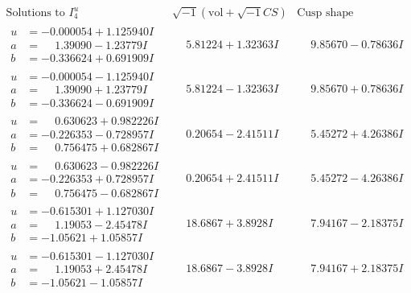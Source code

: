 \documentclass[1p]{elsarticle_modified}
\theoremstyle{definition}
\newcommand{\I}{\sqrt{-1}}
\begin{document}
$$\begin{array}{c|c|c}  
\text{Solutions to }I^u_{4}& \I (\text{vol} + \sqrt{-1}CS) & \text{Cusp shape}\\
 \hline 
\begin{aligned}
u &= -0.000054 + 1.125940 I \\
a &= \phantom{-}1.39090 - 1.23779 I \\
b &= -0.336624 + 0.691909 I\end{aligned}
 & \phantom{-}5.81224 + 1.32363 I & \phantom{-}9.85670 - 0.78636 I \\ \hline\begin{aligned}
u &= -0.000054 - 1.125940 I \\
a &= \phantom{-}1.39090 + 1.23779 I \\
b &= -0.336624 - 0.691909 I\end{aligned}
 & \phantom{-}5.81224 - 1.32363 I & \phantom{-}9.85670 + 0.78636 I \\ \hline\begin{aligned}
u &= \phantom{-}0.630623 + 0.982226 I \\
a &= -0.226353 - 0.728957 I \\
b &= \phantom{-}0.756475 + 0.682867 I\end{aligned}
 & \phantom{-}0.20654 - 2.41511 I & \phantom{-}5.45272 + 4.26386 I \\ \hline\begin{aligned}
u &= \phantom{-}0.630623 - 0.982226 I \\
a &= -0.226353 + 0.728957 I \\
b &= \phantom{-}0.756475 - 0.682867 I\end{aligned}
 & \phantom{-}0.20654 + 2.41511 I & \phantom{-}5.45272 - 4.26386 I \\ \hline\begin{aligned}
u &= -0.615301 + 1.127030 I \\
a &= \phantom{-}1.19053 - 2.45478 I \\
b &= -1.05621 + 1.05857 I\end{aligned}
 & \phantom{-}18.6867 + 3.8928 I & \phantom{-}7.94167 - 2.18375 I \\ \hline\begin{aligned}
u &= -0.615301 - 1.127030 I \\
a &= \phantom{-}1.19053 + 2.45478 I \\
b &= -1.05621 - 1.05857 I\end{aligned}
 & \phantom{-}18.6867 - 3.8928 I & \phantom{-}7.94167 + 2.18375 I \\ \hline\begin{aligned}

\end{aligned}
\end{array}$$
\end{document}
